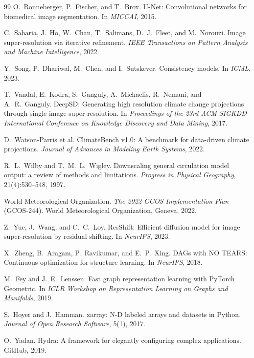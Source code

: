 \documentclass[14pt,a4paper,openany]{extreport}
\theoremstyle{definition}
\begin{document}
\begin{thebibliography}{99}
 O.~Ronneberger, P.~Fischer, and T.~Brox. U-Net: Convolutional networks for biomedical image segmentation. In \emph{MICCAI}, 2015.

 C.~Saharia, J.~Ho, W.~Chan, T.~Salimans, D.~J.~Fleet, and M.~Norouzi. Image super-resolution via iterative refinement. \emph{IEEE Transactions on Pattern Analysis and Machine Intelligence}, 2022.

 Y.~Song, P.~Dhariwal, M.~Chen, and I.~Sutskever. Consistency models. In \emph{ICML}, 2023.

 T.~Vandal, E.~Kodra, S.~Ganguly, A.~Michaelis, R.~Nemani, and A.~R.~Ganguly. DeepSD: Generating high resolution climate change projections through single image super-resolution. In \emph{Proceedings of the 23rd ACM SIGKDD International Conference on Knowledge Discovery and Data Mining}, 2017.

 D.~Watson-Parris et al. ClimateBench v1.0: A benchmark for data-driven climate projections. \emph{Journal of Advances in Modeling Earth Systems}, 2022.

 R.~L.~Wilby and T.~M.~L.~Wigley. Downscaling general circulation model output: a review of methods and limitations. \emph{Progress in Physical Geography}, 21(4):530--548, 1997.

 World Meteorological Organization. \emph{The 2022 GCOS Implementation Plan} (GCOS-244). World Meteorological Organization, Geneva, 2022.

 Z.~Yue, J.~Wang, and C.~C.~Loy. ResShift: Efficient diffusion model for image super-resolution by residual shifting. In \emph{NeurIPS}, 2023.

 X.~Zheng, B.~Aragam, P.~Ravikumar, and E.~P.~Xing. DAGs with NO TEARS: Continuous optimization for structure learning. In \emph{NeurIPS}, 2018.

 M.~Fey and J.~E.~Lenssen. Fast graph representation learning with PyTorch Geometric. In \emph{ICLR Workshop on Representation Learning on Graphs and Manifolds}, 2019.

 S.~Hoyer and J.~Hamman. xarray: N-D labeled arrays and datasets in Python. \emph{Journal of Open Research Software}, 5(1), 2017.

 O.~Yadan. Hydra: A framework for elegantly configuring complex applications. GitHub, 2019.


\end{thebibliography}
\end{document}
